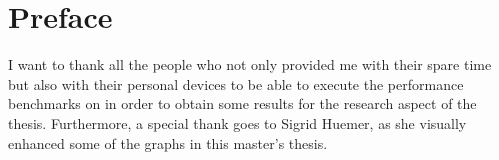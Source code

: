 \chapter{Preface}

I want to thank all the people who not only provided me with their spare time but also with their personal devices to be able to execute the performance benchmarks on in order to obtain some results for the research aspect of the thesis. Furthermore, a special thank goes to Sigrid Huemer, as she visually enhanced some of the graphs in this master's thesis.
